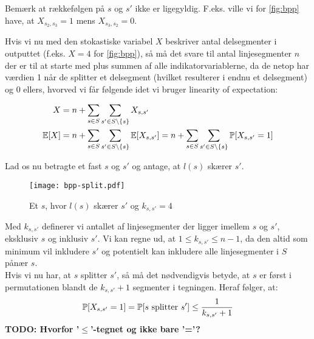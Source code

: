 Bemærk at rækkefølgen på $s$ og $s'$ ikke er ligegyldig. F.eks. ville vi for \ref{fig:bpp} have, at $X_{s_2, s_3} = 1$ mens $X_{s_3, s_2} = 0$.

Hvis vi nu med den stokastiske variabel $X$ beskriver antal delsegmenter i outputtet (f.eks. $X = 4$ for \ref{fig:bpp}), så må det svare til antal linjesegmenter $n$ der er til at starte med plus summen af alle indikatorvariablerne, da de netop har værdien 1 når de splitter et delsegment (hvilket resulterer i endnu et delsegment) og 0 ellers, hvorved vi får følgende idet vi bruger linearity of expectation:

\begin{align}
    X     &= n + \sum_{s \in S} \sum_{s' \in S \backslash \{ s\}} X_{s, s'} \nonumber \\
    \e[X] &= n + \sum_{s \in S} \sum_{s' \in S \backslash \{ s\}} \e[X_{s, s'}]
           = n + \sum_{s \in S} \sum_{s' \in S \backslash \{ s\}} \P[X_{s, s'} = 1] \label{eq:bpp-X-init}
\end{align}

Lad os nu betragte et fast $s$ og $s'$ og antage, at $l(s)$ skærer $s'$.
\begin{figure}[H]
    \begin{center}
    \texttt{[image: bpp-split.pdf]}
    \end{center}
    \caption{Et $s$, hvor $l(s)$ skærer $s'$ og $k_{s, s'} = 4$}
    \label{fig:bpp-split}
\end{figure}


Med $k_{s, s'}$ definerer vi antallet af linjesegmenter der ligger imellem $s$ og $s'$, eksklusiv $s$ og inklusiv $s'$. Vi kan regne ud, at $1 \leq k_{s, s'} \leq n-1$, da den altid som minimum vil inkludere $s'$ og potentielt kan inkludere alle linjesegmenter i $S$ pånær $s$.\\

Hvis vi nu har, at $s$ splitter $s'$, så må det nødvendigvis betyde, at $s$ er først i permutationen blandt de $k_{s, s'} + 1$ segmenter i tegningen. Heraf følger, at:
\begin{align} \label{eq:bpp-prob-split}
    \P[X_{s, s'} = 1] = \P[\text{$s$ splitter $s'$}] \leq \frac{1}{k_{s, s'} + 1}
\end{align}
\textbf{TODO: Hvorfor '$\leq$'-tegnet og ikke bare '='?} %


